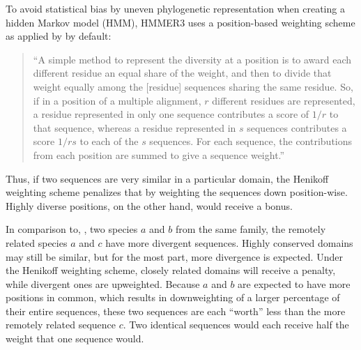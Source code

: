 \label{sec:hmmtest}
To avoid statistical bias by uneven phylogenetic representation when creating a
hidden Markov model (HMM), HMMER3 \citep{eddy2009} uses a position-based
weighting scheme as applied by \citet{henikoff1994} by default: 

\begin{quote}
	``A simple method to represent the diversity at a position is to award each
	different residue an equal share of the weight, and then to divide that
	weight equally among the [residue] sequences sharing the same residue. So, if
	in a position of a multiple alignment, $r$ different residues are represented,
	a residue represented in only one sequence contributes a score of $1/r$ to
	that sequence, whereas a residue represented in $s$ sequences contributes a
	score $1/rs$ to each of the $s$ sequences. For each sequence, the
	contributions from each position are summed to give a sequence weight.''
	\hfill\citep{henikoff1994}
\end{quote} 

Thus, if two sequences are very similar in a particular domain, the Henikoff
weighting scheme penalizes that by weighting the sequences down
position-wise. Highly diverse positions, on the other hand, would receive a
bonus. 

In comparison to, \eg, two species $a$ and $b$ from the same family, the
remotely related species $a$ and $c$ have more divergent sequences. Highly
conserved domains may still be similar, but for the most part, more divergence
is expected. Under the Henikoff weighting scheme, closely related domains will
receive a penalty, while divergent ones are upweighted. Because $a$ and $b$ are
expected to have more positions in common, which results in downweighting of a
larger percentage of their entire sequences, these two sequences are each
``worth'' less than the more remotely related sequence $c$. Two identical
sequences would each receive half the weight that one sequence would.
